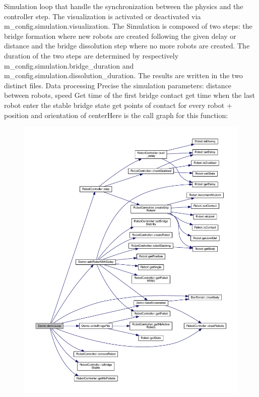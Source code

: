 Simulation loop that handle the synchronization between the physics and the controller step. The visualization is activated or deactivated via m\+\_\+config.\+simulation.\+visualization. The Simulation is composed of two steps\+: the bridge formation where new robots are created following the given delay or distance and the bridge dissolution step where no more robots are created. The duration of the two steps are determined by respectively m\+\_\+config.\+simulation.\+bridge\+\_\+duration and m\+\_\+config.\+simulation.\+dissolution\+\_\+duration. The results are written in the two distinct files. Data processing Precise the simulation parameters\+: distance between robots, speed Get time of the first bridge contact get time when the last robot enter the stable bridge state get points of contact for every robot + position and orientation of centerHere is the call graph for this function\+:\nopagebreak
\begin{figure}[H]
\begin{center}
\leavevmode
\includegraphics[width=350pt]{class_demo_a5b12f30547c9f8e89d63ab84bf0cb95f_cgraph}
\end{center}
\end{figure}
\mbox{\label{class_demo_ac6657b0f7f55a81ba215811d31d9e5b5}} 
